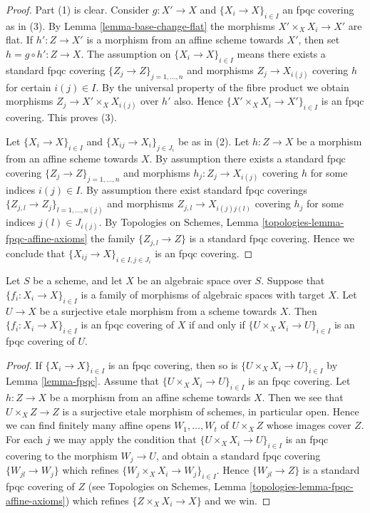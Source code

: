 \begin{proof}
Part (1) is clear. Consider $g : X' \to X$ and
$\{X_i \to X\}_{i\in I}$ an fpqc covering as in (3).
By Lemma \ref{lemma-base-change-flat} the morphisms $X' \times_X X_i \to X'$
are flat. If $h' : Z \to X'$ is a morphism from an affine scheme
towards $X'$, then set $h = g \circ h' : Z \to X$. The assumption
on $\{X_i \to X\}_{i\in I}$ means there exists a standard fpqc covering
$\{Z_j \to Z\}_{j = 1, \ldots, n}$ and morphisms $Z_j \to X_{i(j)}$ covering
$h$ for certain $i(j) \in I$. By the universal property of the fibre product
we obtain morphisms $Z_j \to X' \times_X X_{i(j)}$ over $h'$ also.
Hence $\{X' \times_X X_i \to X'\}_{i\in I}$ is an fpqc covering.
This proves (3).

\medskip\noindent
Let $\{X_i \to X\}_{i\in I}$ and $\{X_{ij} \to X_i\}_{j\in J_i}$ be as
in (2). Let $h : Z \to X$ be a morphism from an affine scheme towards $X$.
By assumption there exists a standard fpqc covering
$\{Z_j \to Z\}_{j = 1, \ldots, n}$ and morphisms $h_j : Z_j \to X_{i(j)}$
covering $h$ for some indices $i(j) \in I$. By assumption there exist
standard fpqc coverings
$\{Z_{j, l} \to Z_j\}_{l = 1, \ldots, n(j)}$
and morphisms $Z_{j, l} \to X_{i(j)j(l)}$ covering
$h_j$ for some indices $j(l) \in J_{i(j)}$. By
Topologies on Schemes, Lemma \ref{topologies-lemma-fpqc-affine-axioms}
the family $\{Z_{j, l} \to Z\}$ is a standard fpqc covering.
Hence we conclude that $\{X_{ij} \to X\}_{i \in I, j\in J_i}$
is an fpqc covering.
\end{proof}

\begin{lemma}
\label{lemma-recognize-fpqc-covering}
Let $S$ be a scheme, and let $X$ be an algebraic space over $S$.
Suppose that $\{f_i : X_i \to X\}_{i \in I}$ is a family of morphisms of
algebraic spaces with target $X$. Let $U \to X$ be a surjective
etale morphism from a scheme towards $X$. Then
$\{f_i : X_i \to X\}_{i \in I}$ is an fpqc covering of $X$ if and only
if $\{U \times_X X_i \to U\}_{i \in I}$ is an fpqc covering of $U$.
\end{lemma}

\begin{proof}
If $\{X_i \to X\}_{i \in I}$ is an fpqc covering, then so is
$\{U \times_X X_i \to U\}_{i \in I}$ by Lemma \ref{lemma-fpqc}.
Assume that $\{U \times_X X_i \to U\}_{i \in I}$ is an fpqc covering.
Let $h : Z \to X$ be a morphism from an affine scheme towards $X$.
Then we see that $U \times_X Z \to Z$ is a surjective etale morphism
of schemes, in particular open. Hence we can find finitely many affine opens
$W_1, \ldots, W_t$ of $U \times_X Z$ whose images cover $Z$.
For each $j$ we may apply the condition that
$\{U \times_X X_i \to U\}_{i \in I}$ is an fpqc covering
to the morphism $W_j \to U$, and obtain a standard fpqc covering
$\{W_{jl} \to W_j\}$ which refines $\{W_j \times_X X_i \to W_j\}_{i \in I}$.
Hence $\{W_{jl} \to Z\}$ is a standard fpqc covering of $Z$
(see Topologies on Schemes, Lemma \ref{topologies-lemma-fpqc-affine-axioms})
which refines $\{Z \times_X X_i \to X\}$ and we win.
\end{proof}





